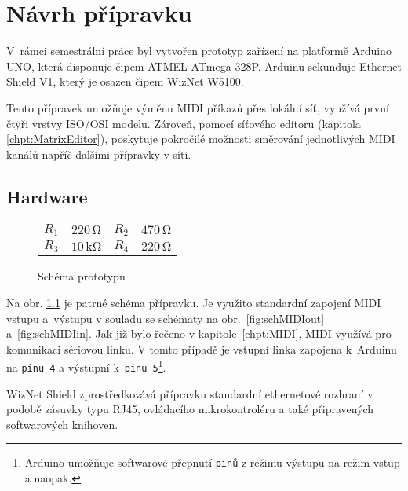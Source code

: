 
\chapter{Návrh přípravku}
V~rámci semestrální práce byl vytvořen prototyp zařízení na platformě Ar\-du\-ino UNO, která disponuje čipem ATMEL ATmega 328P. Ar\-du\-inu sekunduje Ether\-net Shield V1, který je osazen čipem WizNet W5100. 

Tento přípravek umožňuje výměnu \acs{MIDI} příkazů přes lokální síť, využívá první čtyři vrstvy ISO/OSI modelu. Zároveň, pomocí síťového editoru (kapitola \ref{chpt:MatrixEditor}), poskytuje pokročilé možnosti směrování jednotlivých \acs{MIDI} kanálů napříč dalšími přípravky v síti.

\section{Hardware}\label{chpt:Schema}
\begin{figure}[h]
    \centering
    
    \begin{tabular}{l c l c}
        \small
        $R_1$ & $220\,\mathrm{\Omega}$ & $R_2$ & $470\,\mathrm{\Omega}$ \\
        $R_3$ & $10\,\mathrm{k\Omega}$ & $R_4$ & $220\,\mathrm{\Omega}$
    \end{tabular}
    \caption{Schéma prototypu \cite{Indest}} 
    \label{fig:schPrototype}
\end{figure}

Na obr. \ref{fig:schPrototype} je patrné schéma přípravku. Je využito standardní zapojení \acs{MIDI} vstupu a~výstupu v souladu se schématy na obr.~\ref{fig:schMIDIout} a~\ref{fig:schMIDIin}. Jak již bylo řečeno v kapitole~\ref{chpt:MIDI}, \acs{MIDI} využívá pro komunikaci sériovou linku. V tomto případě je vstupní linka zapojena k~Arduinu na \texttt{pinu~4} a výstupní k~\texttt{pinu~5}\footnote{Arduino umožňuje softwarové přepnutí \texttt{pinů} z režimu výstupu na režim vstup a naopak.}. 

WizNet Shield zprostředkovává přípravku standardní ethernetové rozhraní v podobě zásuvky typu RJ45, ovládacího mikrokontroléru a také připravených softwarových knihoven.


